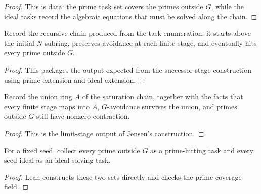 \begin{proof}
  This is data: the prime task set covers the primes outside \(G\), while the
  ideal tasks record the algebraic equations that must be solved along the
  chain.
\end{proof}

\begin{definition}
  \label{def:jensen_saturation_recursive_chain_data}
  Record the recursive chain produced from the task enumeration: it starts
  above the initial \(N\)-subring, preserves avoidance at each finite stage,
  and eventually hits every prime outside \(G\).
\end{definition}

\begin{proof}
  This packages the output expected from the successor-stage construction using
  prime extension and ideal extension.
\end{proof}

\begin{definition}
  \label{def:jensen_saturation_union_data}
  Record the union ring \(A\) of the saturation chain, together with the facts
  that every finite stage maps into \(A\), \(G\)-avoidance survives the union,
  and primes outside \(G\) still have nonzero contraction.
\end{definition}

\begin{proof}
  This is the limit-stage output of Jensen's construction.
\end{proof}

\begin{lemma}
  \label{lem:jensen_saturation_task_enumeration_source}
  For a fixed seed, collect every prime outside \(G\) as a prime-hitting task
  and every seed ideal as an ideal-solving task.
\end{lemma}

\begin{proof}
  Lean constructs these two sets directly and checks the prime-coverage field.
\end{proof}

